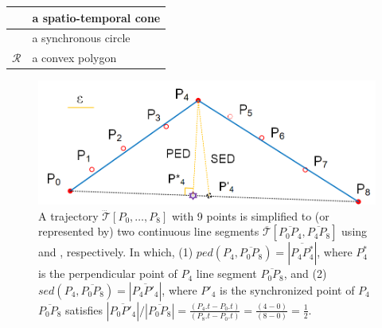 \begin{table}
\begin{tabular}{|c|l|}
		\cone{} & a spatio-temporal cone \\		\hline
		\circle{} & a synchronous circle \\		\hline
		$\mathcal{R}$& a convex polygon \\		\hline
	\end{tabular}
	\label{tab:notations}
	\vspace{-2ex}
\end{table}


\begin{figure}[tb!]
	\centering
	\includegraphics[scale=0.9]{Figures/Fig-Concepts.png}\vspace{-1ex}
	\caption{\small  A trajectory $\dddot{\mathcal{T}}[P_0, \ldots, P_{8}]$ with 9 points is simplified to (or represented by) two continuous line segments $ \overline{\mathcal{T}}[\overline{P_0P_4}, \overline{P_4P_{8}}] $ using \ped and \sed, respectively. In which, (1) $ped(P_4, \overline{P_0P_{8}})=|\overline{P_4P^*_4}|$, where $P^*_4$ is the perpendicular point of $P_4$ \wrt line segment $\overline{P_0P_{8}}$, and (2) $sed(P_4, \overline{P_0P_{8}})= |\overline{P_4P'_4}|$, where $P'_4$ is the synchronized point of $P_4$ \wrt $\overline{P_0P_{8}}$ satisfies ${|\overline{P_0P'_4}|}/{|\overline{P_0P_{8}}|} = \frac{(P_4.t - P_0.t)}{(P_{8}.t-P_0.t)} = \frac{(4-0)}{(8-0)}= \frac{1}{2}$.}
	\vspace{-2ex}
	\label{fig:concepts}
\end{figure}


